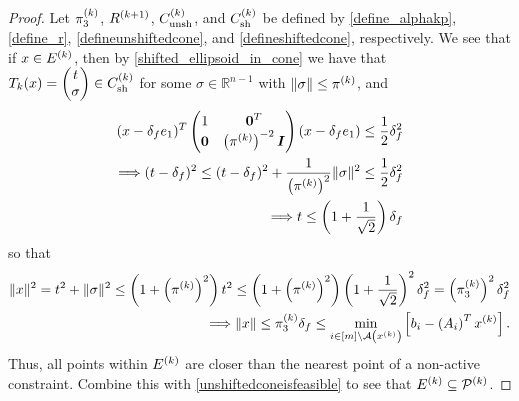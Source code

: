 \documentclass{article}
\begin{document}
\begin{proof}



Let $\pi_3^{(k)}$, ${R^{(k+1)}}$, ${C^{(k)}_{\textrm{unsh}}}$, and ${C^{(k)}_{\textrm{sh}}}$ be defined by
\cref{define_alphakp}, \cref{define_r}, \cref{defineunshiftedcone}, and \cref{defineshiftedcone},
respectively.
We see that if $x \in {E^{(k)}}$,
then by \cref{shifted_ellipsoid_in_cone} we have that $T_k(x) = \begin{pmatrix}t\\ \sigma\end{pmatrix} \in {C^{(k)}_{\textrm{sh}}}$ for some $\sigma \in \mathbb R^{n-1}$
with $\left\|\sigma\right\| \le \pi^{(k)}$, and
\begin{align*}
(x - \delta_{f} e_1)^T\begin{pmatrix}
1 & \boldsymbol0^T \\
\boldsymbol 0 & \left(\pi^{(k)}\right)^{-2} \boldsymbol I \\
\end{pmatrix}(x - \delta_{f} e_1) \le \frac 1 2 \delta_{f}^2 \\
\Longrightarrow (t - \delta_{f})^2 \le (t - \delta_{f})^2 + \frac {1} {\left(\pi^{(k)}\right)^2} \|\sigma\|^2 \le \frac 1 2 \delta_{f}^2 \\
\Longrightarrow t \le \left(1 + \frac 1 {\sqrt{2}}\right) \delta_{f}
\end{align*}
so that 
\begin{align*}
\|x\|^2 = t^2 + \|\sigma\|^2 \le \left(1 + \left(\pi^{(k)}\right)^2 \right) t^2 
\le \left(1 + \left(\pi^{(k)}\right)^2 \right) \left(1 + \frac 1 {\sqrt{2}}\right)^2 \delta_{f}^2 
= \left(\pi_3^{(k)}\right)^2 \delta_{f}^2 \\
\Longrightarrow \|x\| \le \pi_3^{(k)} \delta_{f} \le \min_{i \in [m] \setminus {\mathcal A}\left(x^{(k)}\right)} \left[{{b}}_i - \left({{A}}_i\right)^Tx^{(k)}\right].
\end{align*}
Thus, all points within ${E^{(k)}}$ are closer than the nearest point of a non-active constraint.
Combine this with \cref{unshiftedconeisfeasible} to see that ${E^{(k)}} \subseteq {{\mathcal{P}}^{(k)}}$.
\end{proof}



\end{document}
